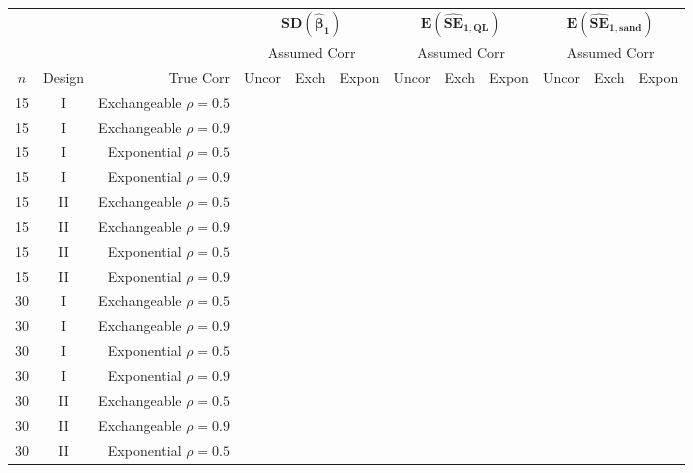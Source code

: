 \documentclass[11pt, letterpaper]{article}
\begin{document}
\begin{table}
  \tiny
\centering
\begin{tabular}{ccr|ccc|ccc|ccc}
&&&\multicolumn{3}{|c}{$\mathbf{SD(\hat\beta_1)}$}&\multicolumn{3}{|c}{$\mathbf{E(\widehat{SE}_{1,QL})}$}&\multicolumn{3}{|c}{$\mathbf{E(\widehat{SE}_{1,sand})}$}\\
&&&\multicolumn{3}{c}{Assumed Corr}&\multicolumn{3}{|c}{Assumed Corr}&\multicolumn{3}{|c}{Assumed Corr}\\
$n$ & Design & True Corr & Uncor & Exch & Expon & Uncor & Exch & Expon & Uncor & Exch & Expon \\ \hline
15 &  I & Exchangeable $\rho=0.5$ &  \\
15 &  I & Exchangeable $\rho=0.9$ &  \\
15 &  I &         Exponential $\rho=0.5$ &  \\
15 &  I &         Exponential $\rho=0.9$ &  \\ [1ex]
15 & II & Exchangeable $\rho=0.5$ &  \\
15 & II & Exchangeable $\rho=0.9$ &  \\
15 & II &         Exponential $\rho=0.5$ &  \\
15 & II &         Exponential $\rho=0.9$ &  \\ [2ex]
30 &  I & Exchangeable $\rho=0.5$ &  \\
30 &  I & Exchangeable $\rho=0.9$ &  \\
30 &  I &         Exponential $\rho=0.5$ &  \\
30 &  I &         Exponential $\rho=0.9$ &  \\ [1ex]
30 & II & Exchangeable $\rho=0.5$ &  \\
30 & II & Exchangeable $\rho=0.9$ &  \\
30 & II &         Exponential $\rho=0.5$ &  \\

\end{tabular}
\end{table}
\end{document}
